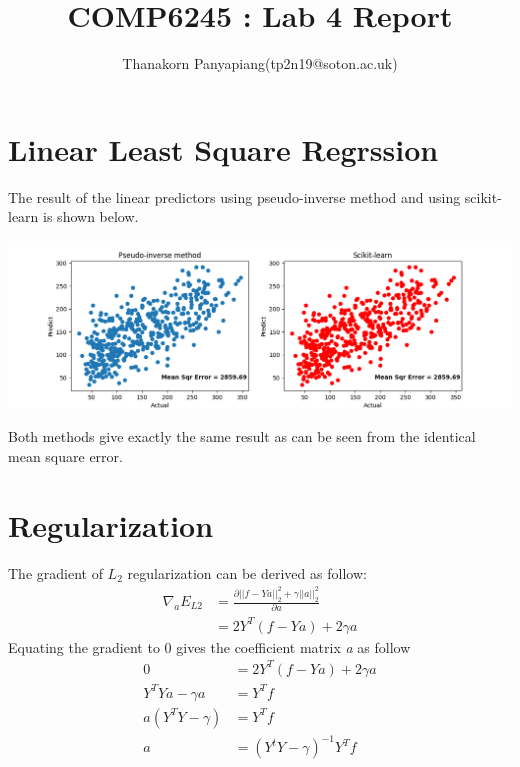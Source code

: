 \documentclass{article}
\title{COMP6245 : Lab 4 Report}
\author{Thanakorn Panyapiang(tp2n19@soton.ac.uk)}
\date{}
\begin{document}
\maketitle

\section{Linear Least Square Regrssion}
The result of the linear predictors using pseudo-inverse method and using scikit-learn is shown below.
\begin{center}
\includegraphics[scale=0.3]{diabetes_accuracy}
\end{center}
Both methods give exactly the same result as can be seen from the identical mean square error.

\section{Regularization}

The gradient of $L_{2}$ regularization can be derived as follow:
\begin{equation}
\begin{split}
	\nabla _aE_{L2} &= \frac{\partial ||f - Ya||^2_2 + \gamma ||a||^2_2}{\partial a}\\
	 &= 2Y^T(f - Ya) + 2\gamma a
\end{split}
\end{equation}
Equating the gradient to 0 gives the coefficient matrix \textit{a} as follow
\begin{equation}
\begin{split}
	0 &= 2Y^T(f - Ya) + 2\gamma a\\
	Y^TYa - \gamma a &= Y^Tf\\
	a(Y^TY - \gamma) &= Y^Tf\\
	a &= (Y^tY - \gamma)^{-1} Y^Tf 
\end{split}
\end{equation}
\end{document}
